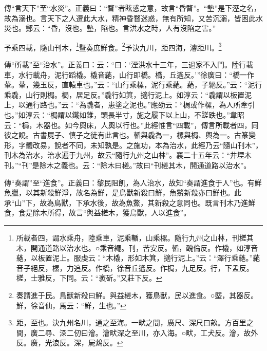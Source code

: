 {\noindent\zhuan{}\fzbyks 傳“言天下”至“水災”。正義曰：“瞀”者眩惑之意，故言“昏瞀”。“墊”是下溼之名，故為溺也。言天下之人遭此大水，精神昏瞀迷惑，無有所知，又苦沉溺，皆困此水災也。鄭云：“昏，沒也。墊，陷也。言洪水之時，人有沒陷之害。” \par}

予乘四載，隨山刊木，\footnote{所載者四，謂水乘舟，陸乘車，泥乘輴，山乘樏。隨行九州之山林，刊槎其木，開通道路以治水也。○乘音繩。刊，苦安反。輴，醜倫反。作橇，如淳音蕝，以板置泥上。服虔云：“木橇，形如木箕，擿行泥上。”云：“澤行乘蕝。”蕝音子絕反，樏，力追反。作橋，徐音丘遙反。作梮，九足反。行，下孟反。槎，士雅反，下同。云：“袤斫。”又莊下反。}暨奏庶鮮食。\footnote{奏謂進于民。鳥獸新殺曰鮮。與益槎木，獲鳥獸，民以進食。○塈，其器反。鮮，徐音仙，馬云：“鮮，生也。”}予決九川，距四海，濬距川。\footnote{距，至也。決九州名川，通之至海。一畎之間，廣尺、深尺曰畝。方百里之間，廣二尋、深二仞曰澮。澮畎深之至川，亦入海。○畎，工犬反。澮，故外反。廣，光浪反。深，屍鴆反。}


{\noindent\zhuan{}\fzbyks 傳“所載”至“治水”。正義曰：云：“曰：‘湮洪水十三年，三過家不入門。陸行載車，水行載舟，泥行蹈橇。橇音蕝，山行即橋。橋，丘遙反。’”徐廣曰：“橋一作輂。輂，幾玉反，直轅車也。”云：“山行乘樏，泥行乘蕝。蕝，子絕反。”云：“泥行乘毳，山行則梮。梮，居足反。”毳行如箕，擿行泥上。如淳云：“毳謂以板置泥上，以通行路也。”云：“為毳者，患塗之泥也。”應劭云：“梮或作樏，為人所牽引也。”如淳云：“梮謂以鐵如錐，頭長半寸，施之履下以上山，不蹉跌也。”韋昭云：“梮，木器也。如今輿床，人輿以行也。”此經惟言“四載”，傳言所載者四，同彼之說。古書屍子、慎子之徒有此言也。輴與毳為一，樏與梮、輿為一。古篆變形，字體改易，說者不同，未知孰是。之施功，本為治水，此經乃云“隨山刊木”，刊木為治水，治水遍于九州，故云“隨行九州之山林”。襄二十五年云：“井堙木刊。”“刊”是除木之義也。云：“除木曰槎。”故曰“刊槎其木，開通道路以治水”。\par}

{\noindent\zhuan{}\fzbyks 傳“奏謂”至“進食”。正義曰：黎民阻飢，為人治水，故知“奏謂進食于人”也。有鮮魚臘，以其新殺鮮淨，故名為鮮，是鳥獸新殺曰鮮，魚鱉新殺亦曰鮮也。此承“山”下，故為鳥獸，下承水後，故為魚鱉，其新殺之意同也。既言刊木乃進鮮食，食是除木所得，故言“與益槎木，獲鳥獸，人以進食”。 \par}

